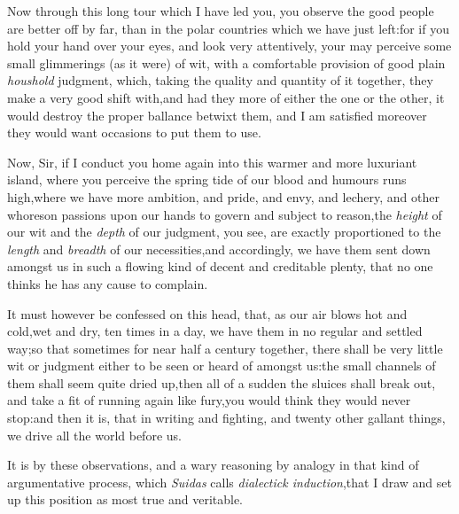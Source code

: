\documentclass{article}
\begin{document}
Now through this long tour which\break
I have led you, you observe the
good people are better off by far, than in the polar countries
which we have just left:\break\tsk for if you hold your hand over your
eyes, and look very attentively, your may perceive some small
glimmerings (as it were) of wit, with a comfortable provision of
good plain \textit{houshold} judgment, which, taking the quality and
quantity of it together, they make a very good shift
with,\tsk and had they more of either the one or the other,
it would destroy the proper ballance betwixt them, and I am
satisfied moreover they would want occasions to put them to
use.

Now, Sir, if I conduct you home again into this warmer and more
luxuriant island, where you perceive the spring tide of our blood
and humours runs high,\tsh where we have more ambition, and
pride, and envy, and lechery, and other whoreson passions upon our
hands to govern and subject to reason,\tsk the
\textit{height} of our wit and the \textit{depth} of our judgment, you
see, are exactly proportioned to the \textit{length} and
\textit{breadth} of our necessities,\tsh and accordingly, we
have them sent down amongst us in such a flowing kind of decent and
creditable plenty, that no one thinks he has any cause to
complain.

It must however be confessed on this head, that, as our air
blows hot and cold,\break\tsh wet and dry, ten times in a day, we have
them in no regular and settled way;\break\tsh so that sometimes for
near half a century together, there shall be very little wit or
judgment either to be seen or heard of amongst us:\tsk the
small channels of them shall seem quite dried up,\tsk\break then
all of a sudden the sluices shall break out, and take a fit of
running again like fury,\tsh you would think they would
never stop:\tsh and then it is, that in writing and fighting, and twenty other
gallant things, we drive all the world before us.

It is by these observations, and a wary reasoning by analogy in
that kind of argumentative process, which \textit{Suidas} calls
\textit{dialectick induction},\tsk that I draw and set up
this position as most true and veri\-table.
\end{document}
